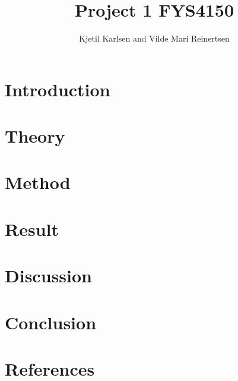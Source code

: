 

\title{Project 1 FYS4150}
\author{Kjetil Karlsen and Vilde Mari Reinertsen}
\raggedbottom



\maketitle

\begin{abstract}

\end{abstract}

\twocolumn

\section{Introduction}


\section{Theory}


\section{Method}


\section{Result}


\section{Discussion}


\section{Conclusion}


\section{References}

